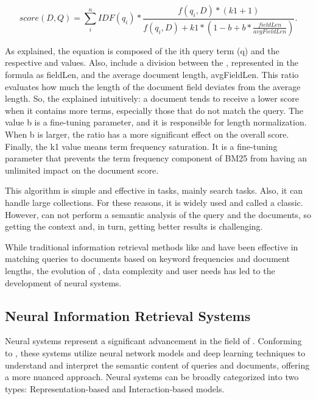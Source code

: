 \begin{equation}
score(D,Q) = \sum_{i}^{n} IDF(q_{i}) \ast \frac{f(q_{i},D) \ast (k1 + 1)}{f(q_{i},D) + k1 \ast (1 - b + b \ast \frac{fieldLen}{avgFieldLen})}.
\label{eqn:bm25}
\end{equation}

As \citet{phd_understanding_2023} explained, the {\bm} equation is composed of the ith query term (q) and the respective {\idf} and {\tf} values. Also, include a division between the {\dl}, represented in the formula as fieldLen, and the average document length, avgFieldLen. This ratio evaluates how much the length of the document field deviates from the average length. So, the \citet{noauthor_practical_2018} explained intuitively: a document tends to receive a lower score when it contains more terms, especially those that do not match the query. The value b is a fine-tuning parameter, and it is responsible for length normalization. When b is larger, the ratio has a more significant effect on the overall score. Finally, the k1 value means term frequency saturation. It is a fine-tuning parameter that prevents the term frequency component of BM25 from having an unlimited impact on the document score.

This algorithm is simple and effective in {\ir} tasks, mainly search tasks. Also, it can handle large collections. For these reasons, it is widely used and called a classic. However, {\bm} can not perform a semantic analysis of the query and the documents, so getting the context and, in turn, getting better results is challenging. 



While traditional information retrieval methods like {\tfidf} and {\bm} have been effective in matching queries to documents based on keyword frequencies and document lengths, the evolution of {\ai}, data complexity and user needs has led to the development of neural {\ir} systems.



\subsection{Neural Information Retrieval Systems}

Neural {\ir} systems represent a significant advancement in the field of {\ir}. Conforming to \citet{mitra_introduction_nodate}, these systems utilize neural network models and deep learning techniques to understand and interpret the semantic content of queries and documents, offering a more nuanced approach. Neural {\ir} systems can be broadly categorized into two types: Representation-based and Interaction-based models.

